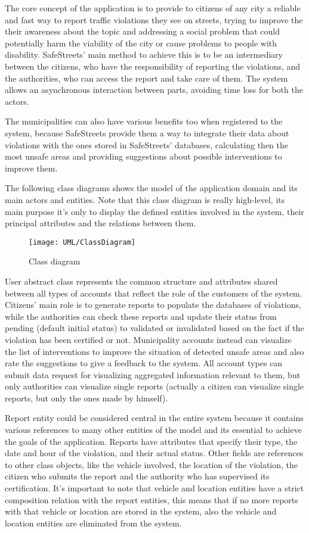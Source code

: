 The core concept of the application is to provide to citizens of any city a reliable and fast way to report traffic violations they see on streets, trying to improve the their awareness about the topic and addressing a social problem that could potentially harm the viability of the city or cause problems to people with disability. SafeStreets' main method to achieve this is to be an intermediary between the citizens, who have the responsibility of reporting the violations, and the authorities, who can access the report and take care of them. The system allows an asynchronous interaction between parts, avoiding time loss for both the actors.

The municipalities can also have various benefits too when registered to the system, because SafeStreets provide them a way to integrate their data about violations with the ones stored in SafeStreets' databases, calculating then the most unsafe areas and providing suggestions about possible interventions to improve them.

The following class diagrams shows the model of the application domain and its main actors and entities. Note that this class diagram is really high-level, its main purpose it's only to display the defined entities involved in the system, their principal attributes and the relations between them.

\begin{figure}[H]
	\centering
	\texttt{[image: UML/ClassDiagram]}
	\caption{Class diagram}
\end{figure}

User abstract class represents the common structure and attributes shared between all types of accounts that reflect the role of the customers of the system. Citizens' main role is to generate reports to populate the databases of violations, while the authorities can check these reports and update their status from pending (default initial status) to validated or invalidated based on the fact if the violation has been certified or not. Municipality accounts instead can visualize the list of interventions to improve the situation of detected unsafe areas and also rate the suggestions to give a feedback to the system. All account types can submit data request for visualizing aggregated information relevant to them, but only authorities can visualize single reports (actually a citizen can visualize single reports, but only the ones made by himself).

Report entity could be considered central in the entire system because it contains various references to many other entities of the model and its essential to achieve the goals of the application. Reports have attributes that specify their type, the date and hour of the violation, and their actual status. Other fields are references to other class objects, like the vehicle involved, the location of the violation, the citizen who submits the report and the authority who has supervised its certification. It's important to note that vehicle and location entities have a strict composition relation with the report entities, this means that if no more reports with that vehicle or location are stored in the system, also the vehicle and location entities are eliminated from the system.

